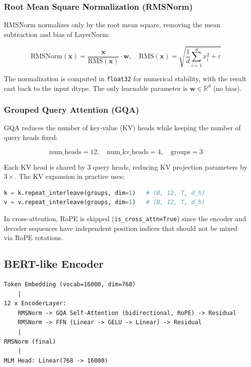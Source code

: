 \documentclass[12pt,a4paper]{article}
\begin{document}
\subsubsection{Root Mean Square Normalization (RMSNorm)}

RMSNorm normalizes only by the root mean square, removing the mean subtraction and bias of LayerNorm:

\[
\text{RMSNorm}(\mathbf{x}) = \frac{\mathbf{x}}{\text{RMS}(\mathbf{x})} \cdot \mathbf{w}, \quad \text{RMS}(\mathbf{x}) = \sqrt{\frac{1}{d}\sum_{i=1}^d x_i^2 + \varepsilon}
\]

The normalization is computed in \texttt{float32} for numerical stability, with the result cast back to the input dtype. The only learnable parameter is $\mathbf{w} \in \mathbb{R}^d$ (no bias).

\subsubsection{Grouped Query Attention (GQA)}

GQA reduces the number of key-value (KV) heads while keeping the number of query heads fixed:

\[
\text{num\_heads} = 12,\quad \text{num\_kv\_heads} = 4,\quad \text{groups} = 3
\]

Each KV head is shared by 3 query heads, reducing KV projection parameters by $3\times$. The KV expansion in practice uses:

\begin{lstlisting}[language=python, caption={KV expansion in GQA}]
k = k.repeat_interleave(groups, dim=1)   # (B, 12, T, d_h)
v = v.repeat_interleave(groups, dim=1)   # (B, 12, T, d_h)
\end{lstlisting}

In cross-attention, RoPE is skipped (\texttt{is\_cross\_attn=True}) since the encoder and decoder sequences have independent position indices that should not be mixed via RoPE rotations.

\subsection{BERT-like Encoder}

\begin{lstlisting}[caption={BERT encoder architecture}]
Token Embedding (vocab=16000, dim=768)
    |
12 x EncoderLayer:
    RMSNorm -> GQA Self-Attention (bidirectional, RoPE) -> Residual
    RMSNorm -> FFN (Linear -> GELU -> Linear) -> Residual
    |
RMSNorm (final)
    |
MLM Head: Linear(768 -> 16000)
\end{lstlisting}
\end{document}
